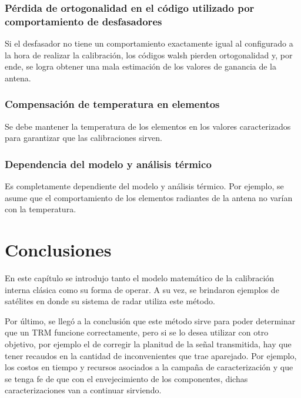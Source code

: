 \subsubsection{Pérdida de ortogonalidad en el código utilizado por comportamiento de desfasadores}

Si el desfasador no tiene un comportamiento exactamente igual al configurado a la hora de realizar la calibración, los códigos
walsh pierden ortogonalidad y, por ende, se logra obtener una mala estimación de los valores de ganancia de la antena.


\subsubsection{Compensación de temperatura en elementos}

Se debe mantener la temperatura de los elementos en los valores caracterizados para garantizar que las calibraciones sirven.


\subsubsection{Dependencia del modelo y análisis térmico}

Es completamente dependiente del modelo y análisis térmico. Por ejemplo, se asume que el comportamiento de los elementos
radiantes de la antena no varían con la temperatura.

\section{Conclusiones}

En este capítulo se introdujo tanto el modelo matemático de la calibración interna clásica como su forma de operar. A su vez,
se brindaron ejemplos de satélites en donde su sistema de radar utiliza este método.

Por último, se llegó a la conclusión que este método sirve para poder determinar que un TRM funcione correctamente, pero si
se lo desea utilizar con otro objetivo, por ejemplo el de corregir la planitud de la señal transmitida, hay que tener recaudos
en la cantidad de inconvenientes que trae aparejado. Por ejemplo, los costos en tiempo y recursos asociados a la campaña de 
caracterización y que se tenga fe de que con el envejecimiento de los componentes, dichas caracterizaciones van a continuar
sirviendo.

